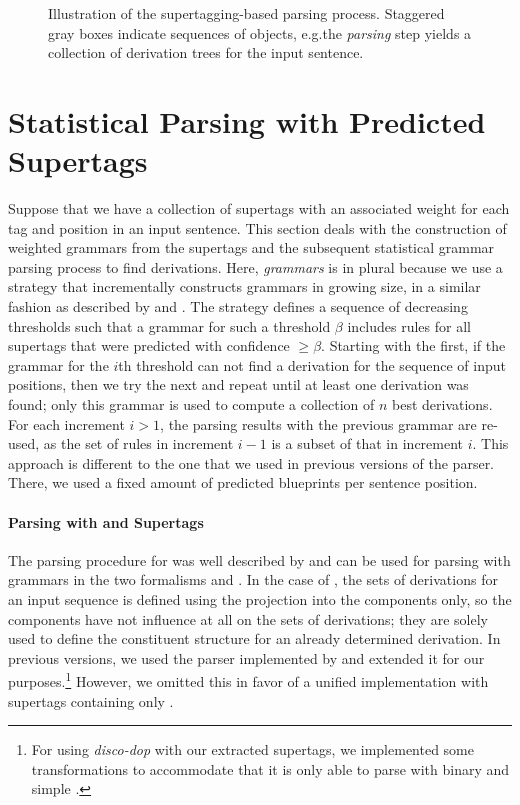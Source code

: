 \documentclass[../document.tex]{subfiles}
\begin{document}
    \begin{figure}
        
        \caption{
            Illustration of the supertagging-based parsing process.
            Staggered gray boxes indicate sequences of objects, e.g.\@ the \emph{parsing} step yields a collection of derivation trees for the input sentence.
        }
    \end{figure}

    \section{Statistical Parsing with Predicted Supertags}
    Suppose that we have a collection of supertags with an associated weight for each tag and position in an input sentence.
    This section deals with the construction of weighted grammars from the supertags and the subsequent statistical grammar parsing process to find derivations.
    Here, \emph{grammars} is in plural because we use a strategy that incrementally constructs grammars in growing size, in a similar fashion as described by \citet[Section 5.1]{Clark04} and \cite[Section 2.2.2]{Auli12}.
    The strategy defines a sequence of decreasing thresholds such that a grammar for such a threshold \(\beta\) includes rules for all supertags that were predicted with confidence \(\ge \beta\).
    Starting with the first, if the grammar for the \(i\)th threshold can not find a derivation for the sequence of input positions, then we try the next and repeat until at least one derivation was found; only this grammar is used to compute a collection of \(n\) best derivations.
    For each increment \(i > 1\), the parsing results with the previous grammar are re-used, as the set of rules in increment \(i-1\) is a subset of that in increment \(i\).
    This approach is different to the one that we used in previous versions of the parser. \citep{RupMoe21, Rup22}
    There, we used a fixed amount of predicted blueprints per sentence position.

    \paragraph{Parsing with  and  Supertags}
    The parsing procedure for  was well described by \citet[Section 7.1]{Kal10} and can be used for parsing with grammars in the two formalisms  and .
    In the case of , the sets of derivations for an input sequence is defined using the projection into the  components only, so the  components have not influence at all on the sets of derivations; they are solely used to define the constituent structure for an already determined derivation.
    In previous versions, we used the  parser implemented by \citet{CraSchBod16} and extended it for our purposes.\footnote{
        For using \emph{disco-dop} with our extracted supertags, we implemented some transformations to accommodate that it is only able to parse with binary and simple .
    }
    However, we omitted this in favor of a unified implementation with supertags containing only .
\end{document}
